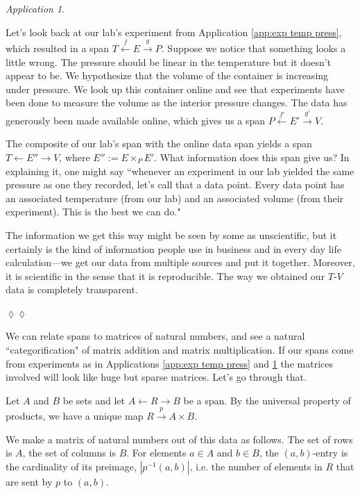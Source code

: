 \documentclass{book}
\def\to{\rightarrow}
\def\from{\leftarrow}
\def\m1{{-1}}
\newcommand{\To}[1]{\xrightarrow{#1}}
\newcommand{\From}[1]{\xleftarrow{#1}}
\theoremstyle{remark}
\newtheorem{app}[subsubsection]{Application}
\newenvironment{application}{\begin{app}}{\hspace*{\fill}$\lozenge\lozenge$\end{app}}
\theoremstyle{definition}
\begin{document}
\begin{application}\label{app:exp temp press 2}

Let's look back at our lab's experiment from Application \ref{app:exp temp press}, which resulted in a span $T\From{f}E\To{g}P$. Suppose we notice that something looks a little wrong. The pressure should be linear in the temperature but it doesn't appear to be. We hypothesize that the volume of the container is increasing under pressure. We look up this container online and see that experiments have been done to measure the volume as the interior pressure changes. The data has generously been made available online, which gives us a span $P\From{f'}E'\To{g'}V$. 

The composite of our lab's span with the online data span yields a span $T\from E''\to V$, where $E'':=E\times_PE'$. What information does this span give us? In explaining it, one might say ``whenever an experiment in our lab yielded the same pressure as one they recorded, let's call that a data point. Every data point has an associated temperature (from our lab) and an associated volume (from their experiment). This is the best we can do." 

The information we get this way might be seen by some as unscientific, but it certainly is the kind of information people use in business and in every day life calculation---we get our data from multiple sources and put it together. Moreover, it is scientific in the sense that it is reproducible. The way we obtained our $T$-$V$ data is completely transparent.

\end{application}

We can relate spans to matrices of natural numbers, and see a natural ``categorification" of matrix addition and matrix multiplication. If our spans come from experiments as in Applications \ref{app:exp temp press} and \ref{app:exp temp press 2} the matrices involved will look like huge but sparse matrices. Let's go through that.

Let $A$ and $B$ be sets and let $A\from R\to B$ be a span. By the universal property of products, we have a unique map $R\To{p}A\times B$. 

We make a matrix of natural numbers out of this data as follows. The set of rows is $A$, the set of columns is $B$. For elements $a\in A$ and $b\in B$, the $(a,b)$-entry is the cardinality of its preimage, $|p^\m1(a,b)|$, i.e. the number of elements in $R$ that are sent by $p$ to $(a,b)$. 
\end{document}
